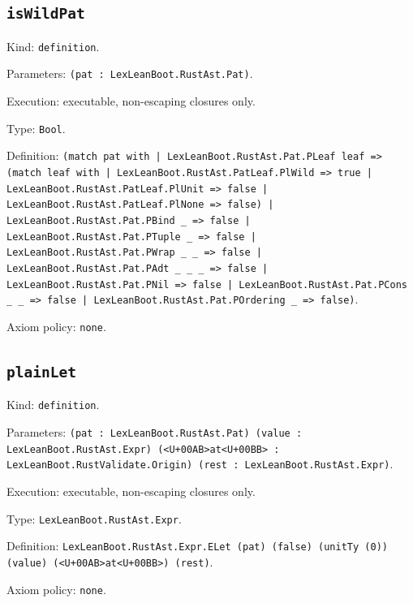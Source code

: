\documentclass[11pt]{article}
\begin{document}
\subsection*{\texttt{isWildPat}}
\noindent Kind: \texttt{definition}.\par
\noindent Parameters: \texttt{(pat : LexLeanBoot.RustAst.Pat)}.\par
\noindent Execution: executable, non-escaping closures only.\par
\noindent Type: \texttt{Bool}.\par
\noindent Definition: \texttt{(match pat with | LexLeanBoot.RustAst.Pat.PLeaf leaf => (match leaf with | LexLeanBoot.RustAst.PatLeaf.PlWild => true | LexLeanBoot.RustAst.PatLeaf.PlUnit => false | LexLeanBoot.RustAst.PatLeaf.PlNone => false) | LexLeanBoot.RustAst.Pat.PBind \_ => false | LexLeanBoot.RustAst.Pat.PTuple \_ => false | LexLeanBoot.RustAst.Pat.PWrap \_ \_ => false | LexLeanBoot.RustAst.Pat.PAdt \_ \_ \_ => false | LexLeanBoot.RustAst.Pat.PNil => false | LexLeanBoot.RustAst.Pat.PCons \_ \_ => false | LexLeanBoot.RustAst.Pat.POrdering \_ => false)}.\par
\noindent Axiom policy: \texttt{none}.\par
\subsection*{\texttt{plainLet}}
\noindent Kind: \texttt{definition}.\par
\noindent Parameters: \texttt{(pat : LexLeanBoot.RustAst.Pat) (value : LexLeanBoot.RustAst.Expr) (<U+00AB>at<U+00BB> : LexLeanBoot.RustValidate.Origin) (rest : LexLeanBoot.RustAst.Expr)}.\par
\noindent Execution: executable, non-escaping closures only.\par
\noindent Type: \texttt{LexLeanBoot.RustAst.Expr}.\par
\noindent Definition: \texttt{LexLeanBoot.RustAst.Expr.ELet (pat) (false) (unitTy (0)) (value) (<U+00AB>at<U+00BB>) (rest)}.\par
\noindent Axiom policy: \texttt{none}.\par
\end{document}
